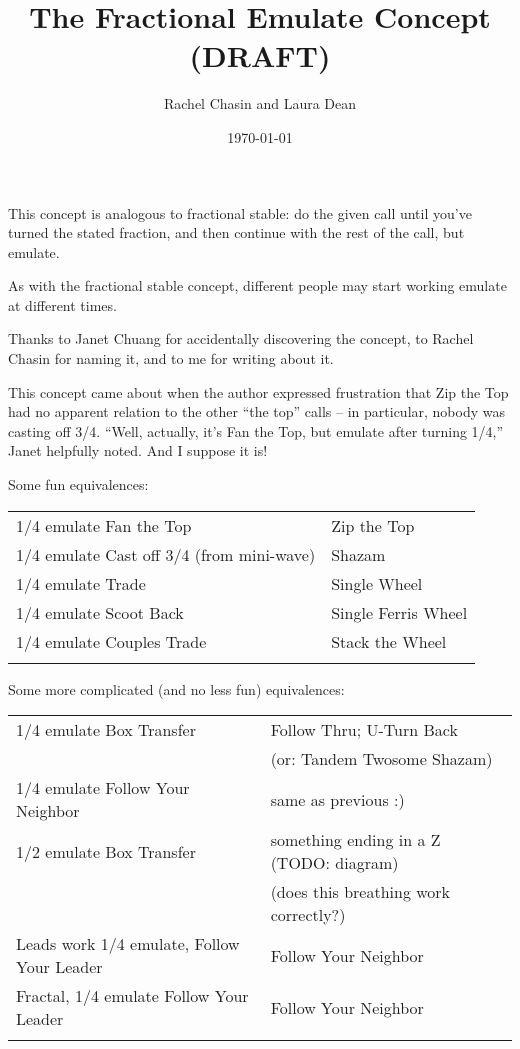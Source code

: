 \documentclass[11pt]{article}
\title{The Fractional Emulate Concept (DRAFT)}
\author{Rachel Chasin and Laura Dean}
\date{\today}
\begin{document}
\thispagestyle{empty}
\maketitle


This concept is analogous to fractional stable:
do the given call until you've turned the stated fraction,
and then continue with the rest of the call, but emulate.

As with the fractional stable concept, different people may start
working emulate at different times.

Thanks to Janet Chuang for accidentally discovering the concept,
to Rachel Chasin for naming it, and to me for writing about it.

This concept came about when the author expressed frustration that Zip
the Top had no apparent relation to the other ``the top'' calls -- in
particular, nobody was casting off 3/4. 
``Well, actually, it's Fan the Top, but emulate after turning 1/4,''
Janet helpfully noted.  And I suppose it is!

Some fun equivalences:

\begin{tabular}{ll}
\hline
1/4 emulate Fan the Top   & Zip the Top \\
1/4 emulate Cast off 3/4 (from mini-wave)  & Shazam \\
1/4 emulate Trade                          & Single Wheel \\
1/4 emulate Scoot Back  & Single Ferris Wheel \\
1/4 emulate Couples Trade  & Stack the Wheel \\
\hline \\
\end{tabular}

Some more complicated (and no less fun) equivalences:

\begin{tabular}{ll}
\hline
1/4 emulate Box Transfer          & Follow Thru; U-Turn Back \\
 & (or: Tandem Twosome Shazam) \\
1/4 emulate Follow Your Neighbor  & same as previous :) \\
1/2 emulate Box Transfer          & something ending in a Z (TODO: diagram) \\
 & (does this breathing work correctly?) \\
Leads work 1/4 emulate, Follow Your Leader & Follow Your Neighbor \\
Fractal, 1/4 emulate Follow Your Leader    & Follow Your Neighbor \\
\hline \\
\end{tabular}
\end{document}
